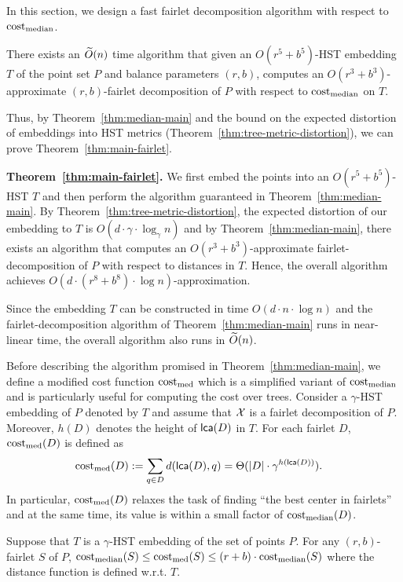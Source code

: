 In this section, we design a fast fairlet decomposition algorithm with respect to $\mathrm{cost}_{\mathrm{median}}$.
\begin{theorem}\label{thm:median-main}
There exists an $\widetilde{O}(n)$ time algorithm that given an $O(r^5 + b^5)$-HST embedding $T$ of the point set $P$ and balance parameters $(r,b)$, computes an $O(r^3+b^3)$-approximate $(r,b)$-fairlet decomposition of $P$ with respect to $\mathrm{cost}_{\mathrm{median}}$ on $T$. 
\end{theorem}
Thus, by Theorem~\ref{thm:median-main} and the bound on the expected distortion of embeddings into HST metrics (Theorem~\ref{thm:tree-metric-distortion}), we can prove Theorem~\ref{thm:main-fairlet}.
\begin{proofof}{\bf Theorem~\ref{thm:main-fairlet}.}
We first embed the points into an $O(r^5 + b^5)$-HST $T$ and then perform the algorithm guaranteed in Theorem~\ref{thm:median-main}. By Theorem~\ref{thm:tree-metric-distortion}, the expected distortion of our embedding to $T$ is $O(d\cdot \gamma \cdot \log_{\gamma} n)$ and by Theorem~\ref{thm:median-main}, there exists an algorithm that computes an $O(r^3+b^3)$-approximate fairlet-decomposition of $P$ with respect to distances in $T$. Hence, the overall algorithm achieves $O(d\cdot (r^8+b^8)\cdot \log n)$-approximation. 

Since the embedding $T$ can be constructed in time $O(d\cdot n \cdot \log n)$ and the fairlet-decomposition algorithm of Theorem~\ref{thm:median-main} runs in near-linear time, the overall algorithm also runs in $\widetilde{O}(n)$.   
\end{proofof}


Before describing the algorithm promised in Theorem~\ref{thm:median-main}, we define a modified cost function $\mathrm{cost}_{\mathrm{med}}$ which is a simplified variant of $\mathrm{cost}_{\mathrm{median}}$ and is particularly useful for computing the cost over trees. Consider a $\gamma$-HST embedding of $P$ denoted by $T$ and assume that $\mathcal{X}$ is a fairlet decomposition of $P$. 
Moreover, $h(D)$ denotes the height of $\textsf{lca}(D)$ in $T$. For each fairlet $D$, $\mathrm{cost}_{\mathrm{med}}(D)$ is defined as
\begin{align}\label{eq:fairlet-cost}
\mathrm{cost}_{\mathrm{med}}(D) &:= \sum_{q\in D} d(\textsf{lca}(D),q) = \Theta(|D| \cdot \gamma^{h(\textsf{lca}(D))}).
\end{align}
In particular, $\mathrm{cost}_{\mathrm{med}}(D)$ relaxes the task of finding ``the best center in fairlets'' and at the same time, its value is within a small factor of $\mathrm{cost}_{\mathrm{median}}(D)$.
\begin{claim}\label{clm:simple-median-cost}
Suppose that $T$ is a $\gamma$-HST embedding of the set of points $P$. For any $(r,b)$-fairlet $S$ of $P$, $\mathrm{cost}_{\mathrm{median}}(S) \leq \mathrm{cost}_{\mathrm{med}}(S) \leq (r+b)\cdot \mathrm{cost}_{\mathrm{median}}(S)$ where the distance function is defined w.r.t. $T$.
\end{claim}

